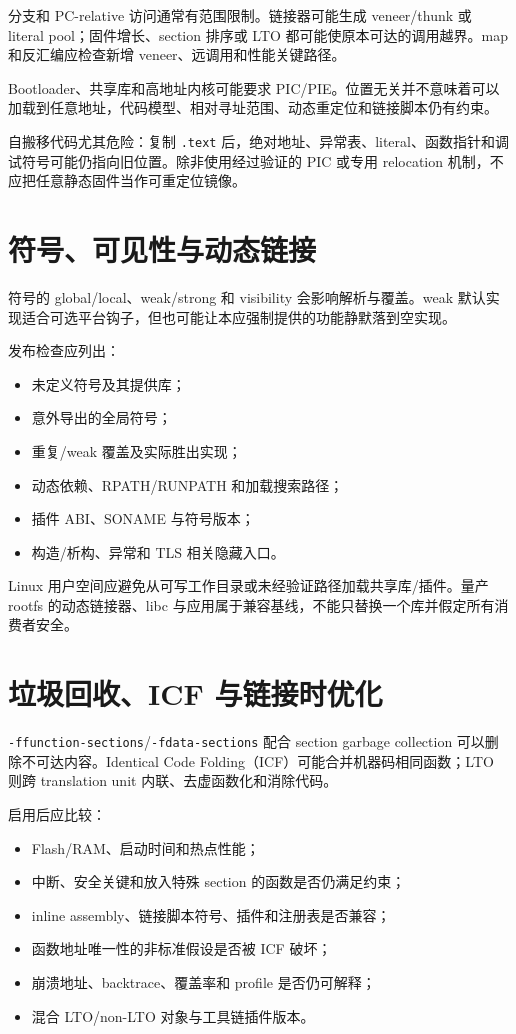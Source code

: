 分支和 PC-relative 访问通常有范围限制。链接器可能生成 veneer/thunk 或 literal pool；固件增长、section 排序或 LTO 都可能使原本可达的调用越界。map 和反汇编应检查新增 veneer、远调用和性能关键路径。

Bootloader、共享库和高地址内核可能要求 PIC/PIE。位置无关并不意味着可以加载到任意地址，代码模型、相对寻址范围、动态重定位和链接脚本仍有约束。

自搬移代码尤其危险：复制 \texttt{.text} 后，绝对地址、异常表、literal、函数指针和调试符号可能仍指向旧位置。除非使用经过验证的 PIC 或专用 relocation 机制，不应把任意静态固件当作可重定位镜像。

\section{符号、可见性与动态链接}

符号的 global/local、weak/strong 和 visibility 会影响解析与覆盖。weak 默认实现适合可选平台钩子，但也可能让本应强制提供的功能静默落到空实现。

发布检查应列出：

\begin{itemize}
  \item 未定义符号及其提供库；
  \item 意外导出的全局符号；
  \item 重复/weak 覆盖及实际胜出实现；
  \item 动态依赖、RPATH/RUNPATH 和加载搜索路径；
  \item 插件 ABI、SONAME 与符号版本；
  \item 构造/析构、异常和 TLS 相关隐藏入口。
\end{itemize}

Linux 用户空间应避免从可写工作目录或未经验证路径加载共享库/插件。量产 rootfs 的动态链接器、libc 与应用属于兼容基线，不能只替换一个库并假定所有消费者安全。

\section{垃圾回收、ICF 与链接时优化}

\texttt{-ffunction-sections}/\texttt{-fdata-sections} 配合 section garbage collection 可以删除不可达内容。Identical Code Folding（ICF）可能合并机器码相同函数；LTO 则跨 translation unit 内联、去虚函数化和消除代码。

启用后应比较：

\begin{itemize}
  \item Flash/RAM、启动时间和热点性能；
  \item 中断、安全关键和放入特殊 section 的函数是否仍满足约束；
  \item inline assembly、链接脚本符号、插件和注册表是否兼容；
  \item 函数地址唯一性的非标准假设是否被 ICF 破坏；
  \item 崩溃地址、backtrace、覆盖率和 profile 是否仍可解释；
  \item 混合 LTO/non-LTO 对象与工具链插件版本。
\end{itemize}

